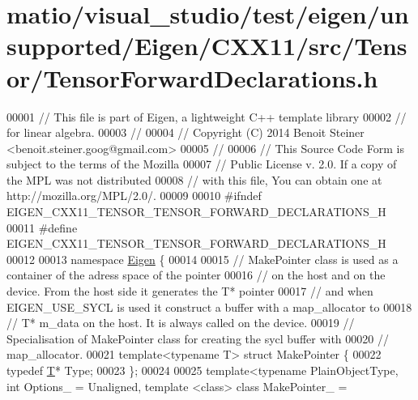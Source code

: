 \hypertarget{matio_2visual__studio_2test_2eigen_2unsupported_2_eigen_2_c_x_x11_2src_2_tensor_2_tensor_forward_declarations_8h_source}{}\section{matio/visual\+\_\+studio/test/eigen/unsupported/\+Eigen/\+C\+X\+X11/src/\+Tensor/\+Tensor\+Forward\+Declarations.h}
\label{matio_2visual__studio_2test_2eigen_2unsupported_2_eigen_2_c_x_x11_2src_2_tensor_2_tensor_forward_declarations_8h_source}

\begin{DoxyCode}
00001 \textcolor{comment}{// This file is part of Eigen, a lightweight C++ template library}
00002 \textcolor{comment}{// for linear algebra.}
00003 \textcolor{comment}{//}
00004 \textcolor{comment}{// Copyright (C) 2014 Benoit Steiner <benoit.steiner.goog@gmail.com>}
00005 \textcolor{comment}{//}
00006 \textcolor{comment}{// This Source Code Form is subject to the terms of the Mozilla}
00007 \textcolor{comment}{// Public License v. 2.0. If a copy of the MPL was not distributed}
00008 \textcolor{comment}{// with this file, You can obtain one at http://mozilla.org/MPL/2.0/.}
00009 
00010 \textcolor{preprocessor}{#ifndef EIGEN\_CXX11\_TENSOR\_TENSOR\_FORWARD\_DECLARATIONS\_H}
00011 \textcolor{preprocessor}{#define EIGEN\_CXX11\_TENSOR\_TENSOR\_FORWARD\_DECLARATIONS\_H}
00012 
00013 \textcolor{keyword}{namespace }\hyperlink{namespace_eigen}{Eigen} \{
00014 
00015 \textcolor{comment}{// MakePointer class is used as a container of the adress space of the pointer}
00016 \textcolor{comment}{// on the host and on the device. From the host side it generates the T* pointer}
00017 \textcolor{comment}{// and when EIGEN\_USE\_SYCL is used it construct a buffer with a map\_allocator to}
00018 \textcolor{comment}{// T* m\_data on the host. It is always called on the device.}
00019 \textcolor{comment}{// Specialisation of MakePointer class for creating the sycl buffer with}
00020 \textcolor{comment}{// map\_allocator.}
00021 \textcolor{keyword}{template}<\textcolor{keyword}{typename} T> \textcolor{keyword}{struct }MakePointer \{
00022   \textcolor{keyword}{typedef} \hyperlink{group___sparse_core___module_class_eigen_1_1_triplet}{T}* Type;
00023 \};
00024 
00025 \textcolor{keyword}{template}<\textcolor{keyword}{typename} PlainObjectType, \textcolor{keywordtype}{int} Options\_ = Unaligned, \textcolor{keyword}{template} <\textcolor{keyword}{class}> \textcolor{keyword}{class }MakePointer\_ = 

\end{DoxyCode}
